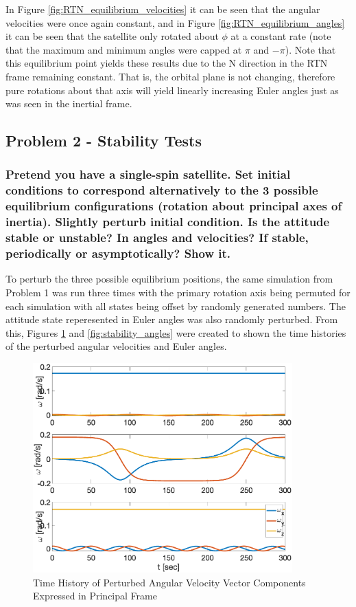 In Figure \ref{fig:RTN_equilibrium_velocities} it can be seen that the angular velocities were once again constant, and in Figure \ref{fig:RTN_equilibrium_angles} it can be seen that the satellite only rotated about $\phi$ at a constant rate (note that the maximum and minimum angles were capped at $\pi$ and $-\pi$). Note that this equilibrium point yields these results due to the N direction in the RTN frame remaining constant. That is, the orbital plane is not changing, therefore pure rotations about that axis will yield linearly increasing Euler angles just as was seen in the inertial frame.

\subsection{Problem 2 - Stability Tests}

\subsubsection{Pretend you have a single-spin satellite. Set initial conditions to correspond alternatively to the 3
possible equilibrium configurations (rotation about principal axes of inertia). Slightly perturb initial
condition. Is the attitude stable or unstable? In angles and velocities? If stable, periodically or
asymptotically? Show it.}

To perturb the three possible equilibrium positions, the same simulation from Problem 1 was run three times with the primary rotation axis being permuted for each simulation with all states being offset by randomly generated numbers. The attitude state reperesented in Euler angles was also randomly perturbed. From this, Figures \ref{fig:stability_velocities} and \ref{fig:stability_angles} were created to shown the time histories of the perturbed angular velocities and Euler angles.

\begin{figure}[H]
    \centering
    \captionsetup{ justification = centering}
    \includegraphics[width = 10cm]{Images/PS4/stability_history_velocity.png}
    \caption{Time History of Perturbed Angular Velocity Vector Components Expressed in Principal Frame}
    \label{fig:stability_velocities}
\end{figure}

